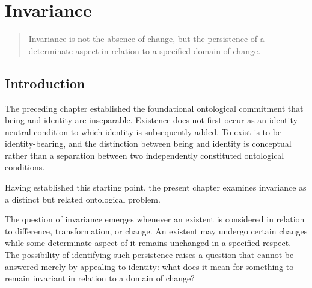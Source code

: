 

\chapter{Invariance}
\label{ch:invariance}


\newcommand{\ChapterTwoTitle}{Invariance}
\newcommand{\ChapterTwoID}{VS.B01.P01.C02}


\begin{quote}
Invariance is not the absence of change, but the persistence
of a determinate aspect in relation to a specified domain
of change.
\end{quote}


\section*{Introduction}

The preceding chapter established the foundational ontological
commitment that being and identity are inseparable. Existence
does not first occur as an identity-neutral condition to which
identity is subsequently added. To exist is to be identity-bearing,
and the distinction between being and identity is conceptual
rather than a separation between two independently constituted
ontological conditions.

Having established this starting point, the present chapter
examines invariance as a distinct but related ontological
problem.

The question of invariance emerges whenever an existent is
considered in relation to difference, transformation, or change.
An existent may undergo certain changes while some determinate
aspect of it remains unchanged in a specified respect. The
possibility of identifying such persistence raises a question
that cannot be answered merely by appealing to identity:
what does it mean for something to remain invariant in relation
to a domain of change?

